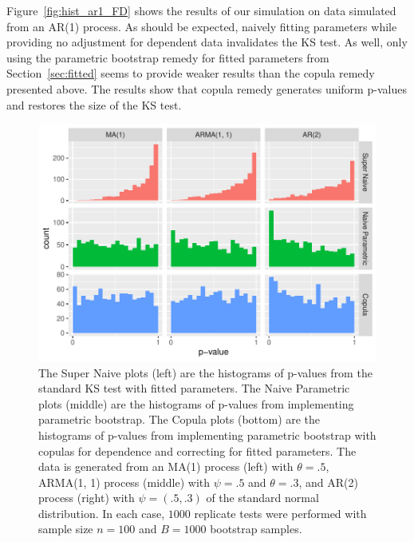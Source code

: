 \documentclass[12pt, letterpaper, titlepage]{article}
\begin{document}
Figure~\ref{fig:hist_ar1_FD} shows the results of our simulation on data
simulated from an AR(1) process. As should be expected, naively fitting
parameters while providing no adjustment for dependent data invalidates the KS
test. As well, only using the parametric bootstrap remedy for fitted parameters
from Section~\ref{sec:fitted} seems to provide weaker results than the
copula remedy presented above. The results show that copula remedy generates
uniform p-values and restores the size of the KS test.

\begin{figure}[tbp]
  \centering
  \includegraphics[width=\textwidth]{hist_ma1_arma_ar2_FD}
  \caption{The Super Naive plots (left) are the histograms of p-values from the
  standard KS test with fitted parameters. The Naive Parametric plots (middle)
  are the histograms of p-values from implementing parametric bootstrap. The
  Copula plots (bottom) are the histograms of p-values from implementing
  parametric bootstrap with copulas for dependence and correcting for fitted
  parameters. The data is generated from an MA(1) process (left) with
  $\theta = .5$, ARMA(1, 1) process (middle) with $\psi = .5$ and $\theta = .3$,
  and AR(2) process (right) with $\psi = (.5, .3)$ of the standard normal
  distribution. In each case, $1000$ replicate tests were performed with sample
  size $n = 100$ and $B = 1000$ bootstrap samples.}
  \label{fig:hist_ma1_arma_ar2_FD}
\end{figure}
\end{document}
